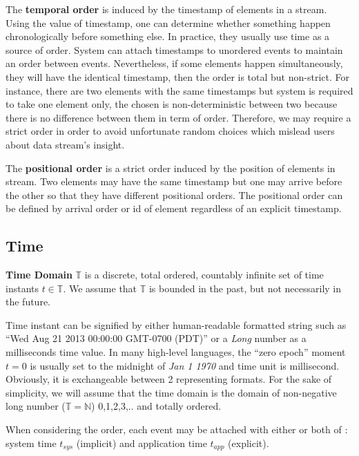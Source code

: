 The \textbf{temporal order} is induced by the timestamp of elements in a stream. Using the value of timestamp, one can determine whether something happen chronologically before something else. In practice, they usually use time as a source of order. System can attach timestamps to unordered events to maintain an order between events. Nevertheless, if some elements happen simultaneously, they will have the identical timestamp, then the order is total but non-strict. For instance, there are two elements with the same timestamps but system is required to take one element only, the chosen is non-deterministic between two because there is no difference between them in term of order. Therefore, we may require a strict order in order to avoid unfortunate random choices which mislead users about data stream's insight.

The \textbf{positional order} is a strict order induced by the position of elements in stream. Two elements  may have the same timestamp but one may arrive before the other so that they have different positional orders. The positional order can be defined by arrival order or id of element regardless of an explicit timestamp. 



\subsection*{Time}
\textbf{Time Domain} $\mathbb{T}$ is a discrete, total ordered, countably infinite set of time instants $t \in \mathbb{T}$. We assume that $\mathbb{T}$ is bounded in the past, but not necessarily in the future.

Time instant can be signified by either human-readable formatted string  such as ``Wed Aug 21 2013 00:00:00 GMT-0700 (PDT)'' or a \textit{Long} number as a milliseconds time value. In many high-level languages, the ``zero epoch'' moment $t = 0$ is usually set to the midnight of \textit{Jan 1 1970} and time unit is millisecond. Obviously, it is exchangeable between 2 representing formats.   
For the sake of simplicity, we will assume that the time domain is the domain of non-negative long number ($\mathbb{T} = \mathbb{N}$) {0,1,2,3,..} and totally ordered\citep{Dindar:2013}.

When considering the order, each event may be attached with either or both of : system time $t_{sys}$ (implicit) and application time $t_{app}$ (explicit). 

